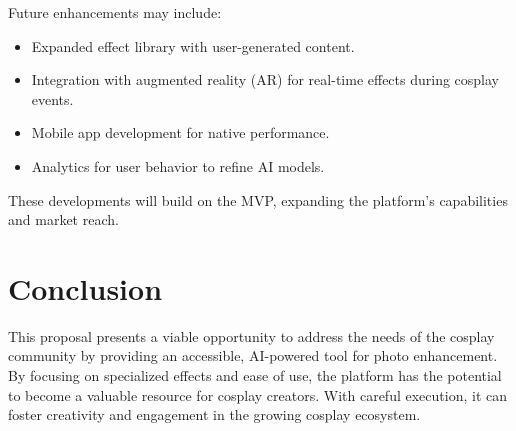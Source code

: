 \documentclass[12pt]{article}
\begin{document}
Future enhancements may include:
\begin{itemize}
    \item Expanded effect library with user-generated content.
    \item Integration with augmented reality (AR) for real-time effects during cosplay events.
    \item Mobile app development for native performance.
    \item Analytics for user behavior to refine AI models.
\end{itemize}

These developments will build on the MVP, expanding the platform's capabilities and market reach.

\section{Conclusion}

This proposal presents a viable opportunity to address the needs of the cosplay community by providing an accessible, AI-powered tool for photo enhancement. By focusing on specialized effects and ease of use, the platform has the potential to become a valuable resource for cosplay creators. With careful execution, it can foster creativity and engagement in the growing cosplay ecosystem.
\end{document}
